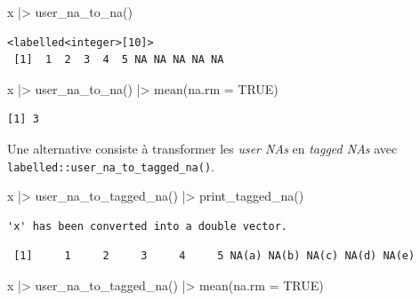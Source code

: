 \documentclass[
  letterpaper,
  DIV=11,
  numbers=noendperiod,
  oneside]{scrreprt}
\newenvironment{Shaded}{\begin{snugshade}}{\end{snugshade}}
\newcommand{\AttributeTok}[1]{\textcolor[rgb]{0.40,0.45,0.13}{#1}}
\newcommand{\ConstantTok}[1]{\textcolor[rgb]{0.56,0.35,0.01}{#1}}
\newcommand{\FunctionTok}[1]{\textcolor[rgb]{0.28,0.35,0.67}{#1}}
\newcommand{\NormalTok}[1]{\textcolor[rgb]{0.00,0.23,0.31}{#1}}
\newcommand{\SpecialCharTok}[1]{\textcolor[rgb]{0.37,0.37,0.37}{#1}}
\begin{document}
\begin{Shaded}
\begin{Highlighting}[]
\NormalTok{x }\SpecialCharTok{|\textgreater{}} 
  \FunctionTok{user\_na\_to\_na}\NormalTok{()}
\end{Highlighting}
\end{Shaded}

\begin{verbatim}
<labelled<integer>[10]>
 [1]  1  2  3  4  5 NA NA NA NA NA
\end{verbatim}

\begin{Shaded}
\begin{Highlighting}[]
\NormalTok{x }\SpecialCharTok{|\textgreater{}} 
  \FunctionTok{user\_na\_to\_na}\NormalTok{() }\SpecialCharTok{|\textgreater{}} 
  \FunctionTok{mean}\NormalTok{(}\AttributeTok{na.rm =} \ConstantTok{TRUE}\NormalTok{)}
\end{Highlighting}
\end{Shaded}

\begin{verbatim}
[1] 3
\end{verbatim}

Une alternative consiste à transformer les \emph{user NAs} en
\emph{tagged NAs} avec \texttt{labelled::user\_na\_to\_tagged\_na()}.

\begin{Shaded}
\begin{Highlighting}[]
\NormalTok{x }\SpecialCharTok{|\textgreater{}} 
  \FunctionTok{user\_na\_to\_tagged\_na}\NormalTok{() }\SpecialCharTok{|\textgreater{}} 
  \FunctionTok{print\_tagged\_na}\NormalTok{()}
\end{Highlighting}
\end{Shaded}

\begin{verbatim}
'x' has been converted into a double vector.
\end{verbatim}

\begin{verbatim}
 [1]     1     2     3     4     5 NA(a) NA(b) NA(c) NA(d) NA(e)
\end{verbatim}

\begin{Shaded}
\begin{Highlighting}[]
\NormalTok{x }\SpecialCharTok{|\textgreater{}} 
  \FunctionTok{user\_na\_to\_tagged\_na}\NormalTok{() }\SpecialCharTok{|\textgreater{}} 
  \FunctionTok{mean}\NormalTok{(}\AttributeTok{na.rm =} \ConstantTok{TRUE}\NormalTok{)}
\end{Highlighting}
\end{Shaded}
\end{document}
